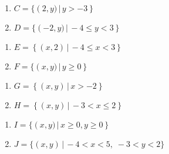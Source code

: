 \begin{multicols}{2}
\begin{enumerate}
\setcounter{enumi}{\value{HW}}

\item $C = \{ \left(2,y) \, | \, y > -3 \right\}$

\item $D = \{ \left(-2,y) \, | \, -4 \leq y < 3 \right\}$

\setcounter{HW}{\value{enumi}}
\end{enumerate}
\end{multicols}

\begin{multicols}{2}
\begin{enumerate}
\setcounter{enumi}{\value{HW}}

\item $E = \left\{ \left(x,2 \right) \, | \, -4 \leq x < 3 \right\}$
\item $F = \{ \left(x,y) \, | \, y \geq 0 \right\}$

\setcounter{HW}{\value{enumi}}
\end{enumerate}
\end{multicols}

\begin{multicols}{2}
\begin{enumerate}
\setcounter{enumi}{\value{HW}}

\item $G = \left\{ \left(x,y \right) \, | \, x > -2 \right\}$
\item $H = \left\{ \left(x,y \right) \, | \, -3 < x \leq 2 \right\}$

\setcounter{HW}{\value{enumi}}
\end{enumerate}
\end{multicols}

\begin{multicols}{2}
\begin{enumerate}
\setcounter{enumi}{\value{HW}}


\item $I = \{ \left(x,y) \, | \, x \geq 0, \! y \geq 0\right\}$

\item $J = \{(x, y) \, | \, -4 < x < 5, \; -3 < y < 2\}$

\setcounter{HW}{\value{enumi}}
\end{enumerate}
\end{multicols}

